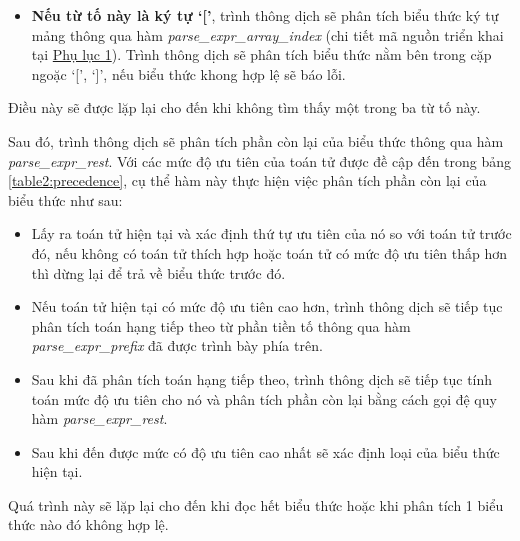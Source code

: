 \begin{itemize}
\begin{itemize}
        \item \textbf{Nếu từ tố này là ký tự `['}, trình thông dịch sẽ phân tích biểu thức ký tự mảng thông qua hàm \textit{parse\_expr\_array\_index} (chi tiết mã nguồn triển khai tại \hyperref[ap1:expr_array_index]{Phụ lục 1}). Trình thông dịch sẽ phân tích biểu thức nằm bên trong cặp ngoặc `[', `]', nếu biểu thức khong hợp lệ sẽ báo lỗi.
    \end{itemize}
    Điều này sẽ được lặp lại cho đến khi không tìm thấy một trong ba từ tố này.
\end{itemize}
Sau đó, trình thông dịch sẽ phân tích phần còn lại của biểu thức thông qua hàm \textit{parse\_expr\_rest}. Với các mức độ ưu tiên của toán tử được đề cập đến trong bảng \ref{table2:precedence}, cụ thể hàm này thực hiện việc phân tích phần còn lại của biểu thức như sau:
\begin{itemize}
    \item Lấy ra toán tử hiện tại và xác định thứ tự ưu tiên của nó so với toán tử trước đó, nếu không có toán tử thích hợp hoặc toán tử có mức độ ưu tiên thấp hơn thì dừng lại để trả về biểu thức trước đó.
    \item Nếu toán tử hiện tại có mức độ ưu tiên cao hơn, trình thông dịch sẽ tiếp tục phân tích toán hạng tiếp theo từ phần tiền tố thông qua hàm \textit{parse\_expr\_prefix} đã được trình bày phía trên.
    \item Sau khi đã phân tích toán hạng tiếp theo, trình thông dịch sẽ tiếp tục tính toán mức độ ưu tiên cho nó và phân tích phần còn lại bằng cách gọi đệ quy hàm \textit{parse\_expr\_rest}.
    \item Sau khi đến được mức có độ ưu tiên cao nhất sẽ xác định loại của biểu thức hiện tại.
\end{itemize}
Quá trình này sẽ lặp lại cho đến khi đọc hết biểu thức hoặc khi phân tích 1 biểu thức nào đó không hợp lệ.
